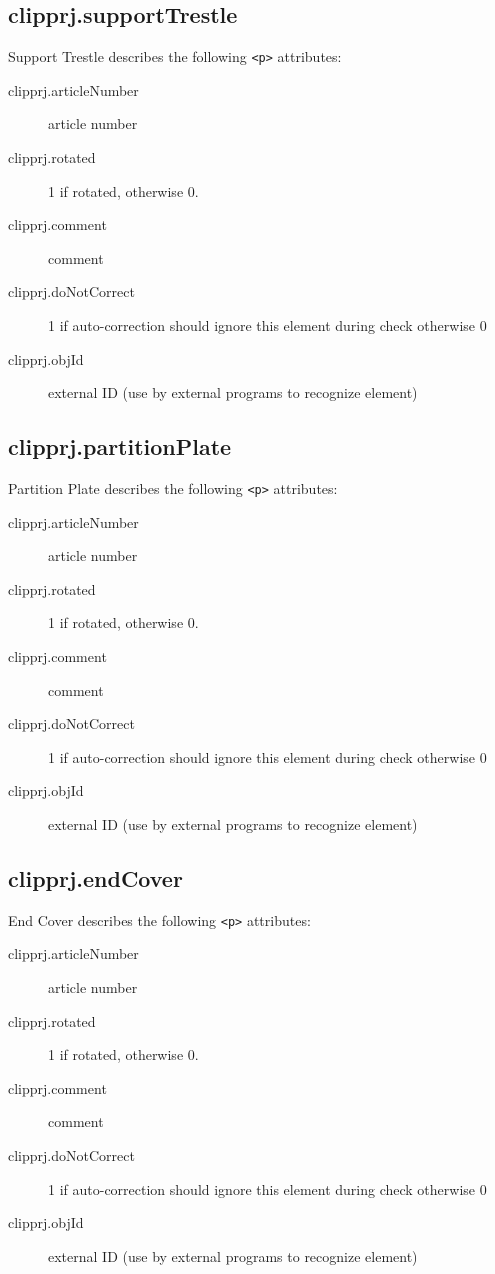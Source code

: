 \documentclass[%
	a4paper,
	oneside,
	listof=numbered,
	parskip=half,
	headsepline=true,
	footsepline=false,
	0.7headlines,
	]{scrbook}
\begin{document}
\subsection{clipprj.supportTrestle}
 
Support Trestle describes the following \verb|<p>| attributes: 

\begin{description}
	\item[clipprj.articleNumber] article number 
	\item[clipprj.rotated] 1 if rotated, otherwise 0. 
	\item[clipprj.comment] comment 
	\item[clipprj.doNotCorrect] 1 if auto-correction should ignore this element during check otherwise 0 
	\item[clipprj.objId] external ID (use by external programs to recognize element) 
\end{description}

\subsection{clipprj.partitionPlate}
 
Partition Plate describes the following \verb|<p>| attributes: 

\begin{description}
	\item[clipprj.articleNumber] article number 
	\item[clipprj.rotated] 1 if rotated, otherwise 0. 
	\item[clipprj.comment] comment 
	\item[clipprj.doNotCorrect] 1 if auto-correction should ignore this element during check otherwise 0 
	\item[clipprj.objId] external ID (use by external programs to recognize element) 
\end{description}

\subsection{clipprj.endCover}
 
End Cover describes the following \verb|<p>| attributes: 

\begin{description}
	\item[clipprj.articleNumber] article number 
	\item[clipprj.rotated] 1 if rotated, otherwise 0. 
	\item[clipprj.comment] comment 
	\item[clipprj.doNotCorrect] 1 if auto-correction should ignore this element during check otherwise 0 
	\item[clipprj.objId] external ID (use by external programs to recognize element) 
\end{description}
\end{document}
